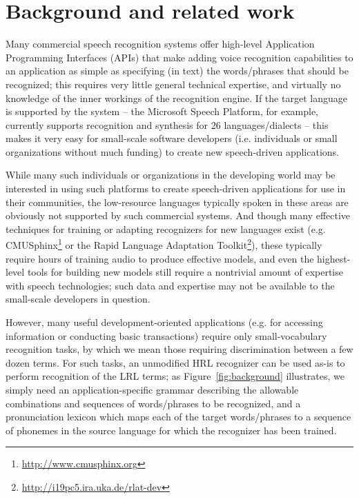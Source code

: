 \documentclass[11pt]{article}
\begin{document}
\section{Background and related work}
\label{sec:background}
Many commercial speech recognition systems offer high-level Application Programming Interfaces (APIs) that make adding voice recognition capabilities to an application as simple as specifying (in text) the words/phrases that should be recognized; this requires very little general technical expertise, and virtually no knowledge of the inner workings of the recognition engine. If the target language is supported by the system -- the Microsoft Speech Platform, for example, currently supports recognition and synthesis for 26 languages/dialects \cite{mspsdk} -- this makes it very easy for small-scale software developers (i.e. individuals or small organizations without much funding) to create new speech-driven applications. 

While many such individuals or organizations in the developing world may be interested in using such platforms to create speech-driven applications for use in their communities, the low-resource languages typically spoken in these areas are obviously not supported by such commercial systems. 
And though many effective techniques for training or adapting recognizers for new languages exist (e.g. CMUSphinx\footnote{\url{http://www.cmusphinx.org}} or the Rapid Language Adaptation Toolkit\footnote{\url{http://i19pc5.ira.uka.de/rlat-dev}}), these typically require hours of training audio to produce effective models, and even the highest-level tools for building new models still require a nontrivial amount of expertise with speech technologies; such data and expertise may not be available to the small-scale developers in question.

However, many useful development-oriented applications (e.g. for accessing information or conducting basic transactions) require only small-vocabulary recognition tasks, by which we mean those requiring discrimination between a few dozen terms.
For such tasks, an unmodified HRL recognizer can be used as-is to perform recognition of the LRL terms; as Figure~\ref{fig:background} illustrates, we simply need an application-specific grammar describing the allowable combinations and sequences of words/phrases to be recognized, and a pronunciation lexicon which maps each of the target words/phrases to a sequence of phonemes in the source language for which the recognizer has been trained. 
\end{document}
